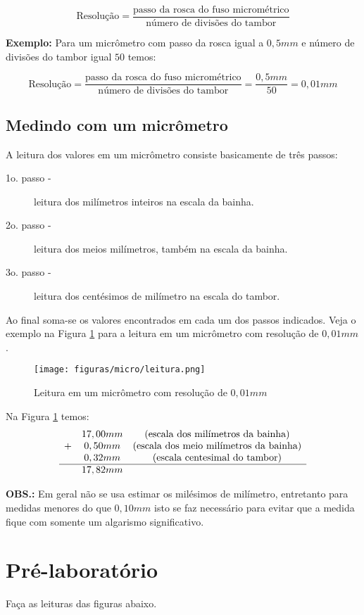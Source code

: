 \documentclass[10pt,a4paper,onecolumn,notitlepage]{scrartcl}
\begin{document}
\[
\text{Resolução} = \frac{\text{passo da rosca do fuso micrométrico}}{\text{número de divisões do tambor}}
\]

\textbf{Exemplo:} Para um micrômetro com passo da rosca igual a $0,5mm$ e número de divisões do tambor igual $50$ temos:

\[
\text{Resolução} = \frac{\text{passo da rosca do fuso micrométrico}}{\text{número de divisões do tambor}}=\frac{0,5mm}{50}= 0,01mm
\]
 
\subsection{Medindo com um micrômetro}

A leitura dos valores em um micrômetro consiste basicamente de três passos:
\begin{description}
\item[1o. passo -] leitura dos milímetros inteiros na escala da bainha.
\item[2o. passo -] leitura dos meios milímetros, também na escala da bainha.
\item[3o. passo -] leitura dos centésimos de milímetro na escala do tambor.
\end{description}
Ao final soma-se os valores encontrados em cada um dos passos indicados. Veja o exemplo na Figura \ref{fig:leitura} para a leitura em um micrômetro com resolução de $0,01mm$.


\begin{figure}[H]
\centering
\texttt{[image: figuras/micro/leitura.png]} 
\caption{Leitura em um micrômetro com resolução de $0,01mm$}
\label{fig:leitura}
\end{figure}

Na Figura \ref{fig:leitura} temos:
\[
\begin{matrix}
& 17,00mm & \text{(escala dos milímetros da bainha)}\\
+ & 0,50mm & \text{(escala dos meio milímetros da bainha)}\\
& 0,32mm & \text{(escala centesimal do tambor)}\\
\hline
& 17,82mm
\end{matrix}
\]

\textbf{OBS.:} Em geral não se usa estimar os milésimos de milímetro, entretanto para medidas menores do que $0,10mm$ isto se faz necessário para evitar que a medida fique com somente um algarismo significativo.

\section{Pré-laboratório}
Faça as leituras das figuras abaixo.
\end{document}
